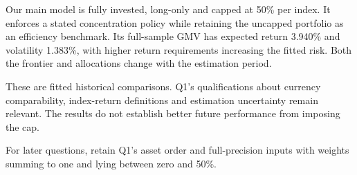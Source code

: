 \documentclass[
  10pt,
  a4paper,
]{article}
\begin{document}
Our main model is fully invested, long-only and capped at 50\% per
index. It enforces a stated concentration policy while retaining the
uncapped portfolio as an efficiency benchmark. Its full-sample GMV has
expected return 3.940\% and volatility 1.383\%, with higher return
requirements increasing the fitted risk. Both the frontier and
allocations change with the estimation period.

These are fitted historical comparisons. Q1's qualifications about
currency comparability, index-return definitions and estimation
uncertainty remain relevant. The results do not establish better future
performance from imposing the cap.

For later questions, retain Q1's asset order and full-precision inputs
with weights summing to one and lying between zero and 50\%.
\end{document}
